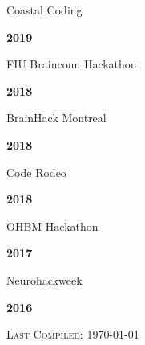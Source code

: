 \documentclass[10pt]{article}
\newenvironment{bottompar}{\par\vspace*{\fill}}{\clearpage}
\newcommand{\headstyle}{\scshape \normalsize \textcolor{light-gray}}
\begin{document}
\begin{minipage}[t]{.85\linewidth}
\flushleft
\noindent
Coastal Coding
\end{minipage}
\hfill
\begin{minipage}[t]{.15\linewidth}
\flushright
\noindent
\textsc{\textbf{2019}}
\end{minipage}

\begin{minipage}[t]{.85\linewidth}
\flushleft
\noindent
FIU Brainconn Hackathon
\end{minipage}
\hfill
\begin{minipage}[t]{.15\linewidth}
\flushright
\noindent
\textsc{\textbf{2018}}
\end{minipage}

\begin{minipage}[t]{.85\linewidth}
\flushleft
\noindent
BrainHack Montreal
\end{minipage}
\hfill
\begin{minipage}[t]{.15\linewidth}
\flushright
\noindent
\textsc{\textbf{2018}}
\end{minipage}

\begin{minipage}[t]{.85\linewidth}
\flushleft
\noindent
Code Rodeo
\end{minipage}
\hfill
\begin{minipage}[t]{.15\linewidth}
\flushright
\noindent
\textsc{\textbf{2018}}
\end{minipage}

\begin{minipage}[t]{.85\linewidth}
\flushleft
\noindent
OHBM Hackathon
\end{minipage}
\hfill
\begin{minipage}[t]{.15\linewidth}
\flushright
\noindent
\textsc{\textbf{2017}}
\end{minipage}

\begin{minipage}[t]{.85\linewidth}
\flushleft
\noindent
Neurohackweek
\end{minipage}
\hfill
\begin{minipage}[t]{.15\linewidth}
\flushright
\noindent
\textsc{\textbf{2016}}
\end{minipage}

\begin{bottompar}
	\begin{center}
		\headstyle{Last Compiled: \today}
	\end{center}
\end{bottompar}
\end{document}
